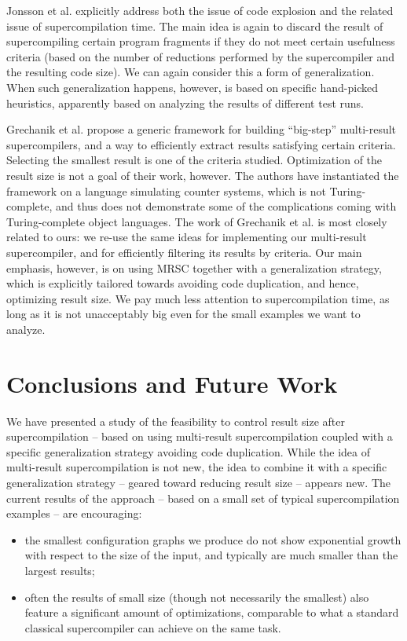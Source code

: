 \documentclass[submission,copyright,creativecommons]{eptcs}
\begin{document}
Jonsson et al. \cite{Jonsson2011Taming} explicitly address both the issue of code explosion and
the related issue of supercompilation time.
The main idea is again to discard the result of supercompiling certain program fragments
if they do not meet certain usefulness criteria (based on the number of reductions performed 
by the supercompiler and the resulting code size).
We can again consider this a form of generalization.
When such generalization happens, however, is based on specific hand-picked heuristics,
apparently based on analyzing the results of different test runs.

Grechanik et al. \cite{Romanenko2014StagedMRSC} propose a generic framework for building ``big-step''
multi-result supercompilers, and a way to efficiently extract results satisfying certain criteria.
Selecting the smallest result is one of the criteria studied.
Optimization of the result size is not a goal of their work, however.
The authors have instantiated the framework on a language simulating counter systems, which
is not Turing-complete, and thus does not demonstrate some of the complications
coming with Turing-complete object languages.
The work of Grechanik et al. \cite{Romanenko2014StagedMRSC} is most closely related to ours: 
we re-use the same ideas for implementing
our multi-result supercompiler, and for efficiently filtering its results by criteria.
Our main emphasis, however, is on using MRSC together with a generalization strategy, which
is explicitly tailored towards avoiding code duplication, and hence, optimizing result size.
We pay much less attention to supercompilation time, as long as it is not unacceptably big
even for the small examples we want to analyze.

\section{Conclusions and Future Work}

We have presented a study of the feasibility to control result size after supercompilation
-- based on using multi-result supercompilation coupled with a specific generalization
strategy avoiding code duplication.
While the idea of multi-result supercompilation is not new, the idea to combine it
with a specific generalization strategy -- geared toward reducing result size --
appears new.
The current results of the approach -- based on a small set of typical supercompilation examples --
are encouraging:
\begin{itemize}
  \item the smallest configuration graphs we produce do not show exponential growth with respect 
    to the size of the input, and typically are much smaller than the largest results;
  \item often the results of small size (though not necessarily the smallest) also feature a
    significant amount of optimizations, comparable to what a standard classical supercompiler
    can achieve on the same task.
\end{itemize}
\end{document}
